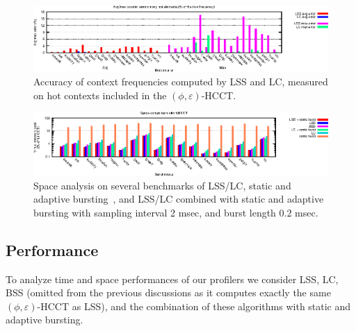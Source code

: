 \documentclass{sigplanconf}
\begin{document}
\begin{figure}[t]
\center\includegraphics[width=\textwidth]{charts/counter-error.eps}
\caption{Accuracy of context frequencies computed by LSS and LC, measured on hot contexts included in the $(\phi,\varepsilon)$-HCCT.}
\label{fig:counterAccuracy}
\end{figure} 

\begin{figure}[t]
\center\includegraphics[width=\textwidth]{charts/space.eps}
\caption{Space analysis on several benchmarks of LSS/LC, static and adaptive bursting~\cite{ZSCC06}, and LSS/LC combined with static and adaptive bursting with sampling interval 2 msec, and burst length 0.2 msec.}
\label{fig:VMPeak}
\end{figure} 


\subsection{Performance}
\label{ss:performance}

To analyze time and space performances of our profilers we consider LSS, LC, BSS (omitted from the previous discussions as it computes exactly the same $(\phi,\varepsilon)$-HCCT as LSS), and the combination of these algorithms with static and adaptive bursting.
\end{document}
